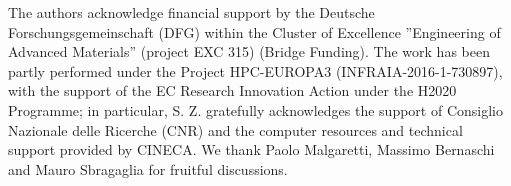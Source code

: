 \begin{acknowledgements}
The authors acknowledge financial support by the Deutsche Forschungsgemeinschaft (DFG) within the Cluster of Excellence ''Engineering of Advanced Materials'' (project EXC 315) (Bridge Funding). 
The work has been partly performed under the Project HPC-EUROPA3 (INFRAIA-2016-1-730897), with the support of the EC Research Innovation Action under the H2020 Programme; in particular, S. Z. gratefully acknowledges the support of Consiglio Nazionale delle Ricerche (CNR) and the computer resources and technical support provided by CINECA.
We thank Paolo Malgaretti, Massimo Bernaschi and Mauro Sbragaglia for fruitful discussions.
\end{acknowledgements}